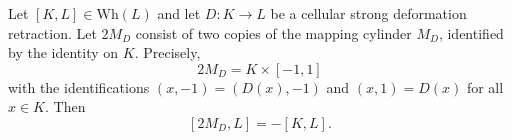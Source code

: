 Let $[K, L] \in \mathrm{Wh}(L)$ and let $D: K \to L$ be a cellular strong deformation retraction. Let $2M_D$ consist of two copies of the mapping cylinder $M_D$, identified by the identity on $K$. Precisely,
$$2M_D = K \times [-1, 1]$$
with the identifications $(x, -1) = (D(x), -1)$ and $(x, 1) = D(x)$ for all $x \in K$. Then
$$[2M_D, L] = -[K, L].$$
